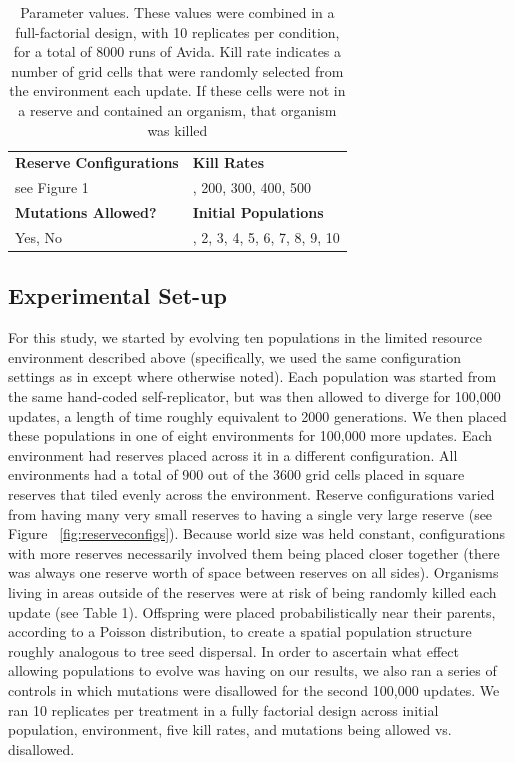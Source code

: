 \documentclass[letterpaper]{article}
\begin{document}
\begin{table}[]
\centering
\begin{tabular}{| >{\centering\arraybackslash}m{1.4in} | >{\centering\arraybackslash}m{1.4in} |}
\hline
\textbf{Reserve Configurations} & \textbf{Kill Rates}           \\
see Figure 1                    & 100, 200, 300, 400, 500       \\ \hline
\textbf{Mutations Allowed?}     & \textbf{Initial Populations}  \\
Yes, No                         & 1, 2, 3, 4, 5, 6, 7, 8, 9, 10 \\ \hline
\end{tabular}
\caption{Parameter values. These values were combined in a full-factorial design, with 10 replicates per condition, for a total of 8000 runs of Avida. Kill rate indicates a number of grid cells that were randomly selected from the environment each update. If these cells were not in a reserve and contained an organism, that organism was killed}
\label{my-label}
\end{table}

\subsection{Experimental Set-up}
 	For this study, we started by evolving ten populations in the limited resource environment described above (specifically, we used the same configuration settings as in \citep{walker_evolutionary_2012} except where otherwise noted). Each population was started from the same hand-coded self-replicator, but was then allowed to diverge for 100,000 updates, a length of time roughly equivalent to 2000 generations. We then placed these populations in one of eight environments for 100,000 more updates. Each environment had reserves placed across it in a different configuration. All environments had a total of 900 out of the 3600 grid cells placed in square reserves that tiled evenly across the environment. Reserve configurations varied from having many very small reserves to having a single very large reserve (see Figure ~\ref{fig:reserveconfigs}). Because world size was held constant, configurations with more reserves necessarily involved them being placed closer together (there was always one reserve worth of space between reserves on all sides). Organisms living in areas outside of the reserves were at risk of being randomly killed each update (see Table 1). Offspring were placed probabilistically near their parents, according to a Poisson distribution, to create a spatial population structure roughly analogous to tree seed dispersal. In order to ascertain what effect allowing populations to evolve was having on our results, we also ran a series of controls in which mutations were disallowed for the second 100,000 updates. We ran 10 replicates per treatment in a fully factorial design across initial population, environment, five kill rates, and mutations being allowed vs. disallowed.
\end{document}
